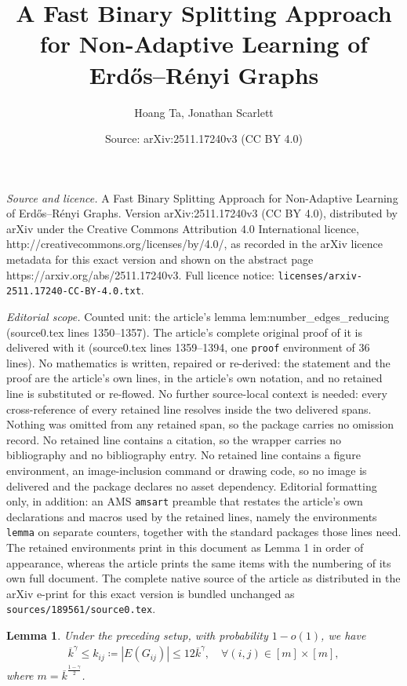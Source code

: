 \documentclass[10pt,a4paper]{amsart}
\title{A Fast Binary Splitting Approach for Non-Adaptive Learning of Erd\H{o}s--R\'enyi Graphs}
\author{Hoang Ta, Jonathan Scarlett}
\date{Source: arXiv:2511.17240v3 (CC BY 4.0)}
\newtheorem{lemma}{Lemma}
\newcommand{\kb}{\overline{k}}
\begin{document}
\maketitle

\noindent\emph{Source and licence.} A Fast Binary Splitting Approach for Non-Adaptive Learning of Erd\H{o}s--R\'enyi Graphs. Version arXiv:2511.17240v3 (CC BY 4.0), distributed by arXiv under the Creative Commons Attribution 4.0 International licence, http://creativecommons.org/licenses/by/4.0/, as recorded in the arXiv licence metadata for this exact version and shown on the abstract page https://arxiv.org/abs/2511.17240v3. Full licence notice: \texttt{licenses/arxiv-2511.17240-CC-BY-4.0.txt}.\par\smallskip

\noindent\textit{Editorial scope.} Counted unit: the article's lemma lem:number\_edges\_reducing (source0.tex lines 1350--1357). The article's complete original proof of it is delivered with it (source0.tex lines 1359--1394, one \texttt{proof} environment of 36 lines). No mathematics is written, repaired or re-derived: the statement and the proof are the article's own lines, in the article's own notation, and no retained line is substituted or re-flowed.  No further source-local context is needed: every cross-reference of every retained line resolves inside the two delivered spans.  Nothing was omitted from any retained span, so the package carries no omission record.  No retained line contains a citation, so the wrapper carries no bibliography and no bibliography entry.  No retained line contains a figure environment, an image-inclusion command or drawing code, so no image is delivered and the package declares no asset dependency.  Editorial formatting only, in addition: an AMS \texttt{amsart} preamble that restates the article's own declarations and macros used by the retained lines, namely the environments \texttt{lemma} on separate counters, together with the standard packages those lines need.  The retained environments print in this document as Lemma 1 in order of appearance, whereas the article prints the same items with the numbering of its own full document.  The complete native source of the article as distributed in the arXiv e-print for this exact version is bundled unchanged as \texttt{sources/189561/source0.tex}.
\begin{lemma}
	\label{lem:number_edges_reducing}
	Under the preceding setup, with probability $1 - o(1)$, we have
	\begin{align*}  
		\kb^{\gamma} \leq k_{ij} \coloneqq |E(G_{ij})| \leq 12\kb^\gamma, \quad \forall (i,j) \in [m] \times [m], 
	\end{align*}
	where $m = \kb^{\frac{1-\gamma}{2}}$. 
\end{lemma}
\end{document}
